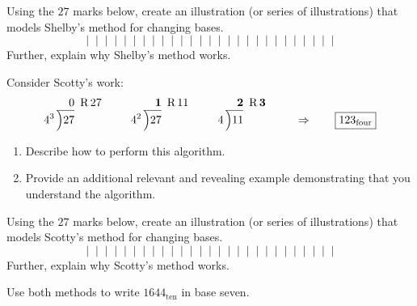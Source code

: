 \documentclass{ximera}
\begin{document}
\begin{problem} 
Using the $27$ marks below, create an illustration (or series of illustrations) that models Shelby's method for changing bases.
\[
|\;\;|\;\;|\;\;|\;\;|\;\;|\;\;|\;\;|\;\;|\;\;|\;\;|\;\;|\;\;|\;\;|\;\;|\;\;|\;\;|\;\;|\;\;|\;\;|\;\;|\;\;|\;\;|\;\;|\;\;|\;\;|\;\;|
\]
Further, explain why Shelby's method works. 
\end{problem}


\begin{problem} Consider Scotty's work:
\[
4^3\,\begin{tabular}[b]{@{}r@{} r}
$0$ &\, R\,$27$\\ \cline{1-1}
\Big)\begin{tabular}[t]{@{}l@{}}
$27$ 
\end{tabular}
\end{tabular}
\qquad
4^2\,\begin{tabular}[b]{@{}r@{} r}
$\boldsymbol{1}$ &\, R\,$11$\\ \cline{1-1}
\Big)\begin{tabular}[t]{@{}l@{}}
$27$ 
\end{tabular}
\end{tabular}
\qquad
4\,\begin{tabular}[b]{@{}r@{} r}
$\boldsymbol{2}$ &\, R\,$\boldsymbol{3}$\\ \cline{1-1}
\Big)\begin{tabular}[t]{@{}l@{}}
$11$ 
\end{tabular}
\end{tabular} \qquad \Rightarrow \qquad \fbox{$123_\textrm{four}$}
\]
\begin{enumerate}
\item Describe how to perform this algorithm.
\item Provide an additional relevant and revealing example
  demonstrating that you understand the algorithm.
\end{enumerate}
\end{problem}


\begin{problem} 
Using the $27$ marks below, create an illustration (or series of illustrations) that models Scotty's method for changing bases.
\[
|\;\;|\;\;|\;\;|\;\;|\;\;|\;\;|\;\;|\;\;|\;\;|\;\;|\;\;|\;\;|\;\;|\;\;|\;\;|\;\;|\;\;|\;\;|\;\;|\;\;|\;\;|\;\;|\;\;|\;\;|\;\;|\;\;|
\]
Further, explain why Scotty's method works. 
\end{problem}

\begin{problem}
Use both methods to write $1644_\textrm{ten}$ in base seven.
\end{problem}
\end{document}

